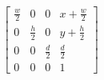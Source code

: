 \documentclass{article}
\begin{document}
\thispagestyle{empty}


$$
\begin{bmatrix}\frac{w}{2}&0&0&x+\frac{w}{2} \\ 0&\frac{h}{2}&0&y+\frac{h}{2}\\ 0&0&\frac{d}{2}&\frac{d}{2}\\ 0 &0 &0&1\end{bmatrix}
$$
\end{document}
